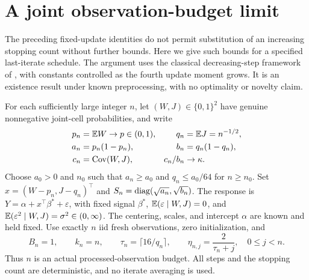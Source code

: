 \section{A joint observation-budget limit}
\label{sec:budget}

The preceding fixed-update identities do not permit substitution of an
increasing stopping count without further bounds. Here we give such bounds for a
specified last-iterate schedule. The argument uses the classical decreasing-step
framework of \citet{moulines2011nonasymptotic}, with constants controlled as the
fourth update moment grows. It is an existence result under known preprocessing,
with no optimality or novelty claim.

For each sufficiently large integer $n$, let $(W,J) \in \{0,1\}^2$ have genuine
nonnegative joint-cell probabilities, and write
\[
 \begin{aligned}
  p_n & = \mathbb{E} W \to p \in (0,1), & q_n     & = \mathbb{E} J = n^{-1/2}, \\
  a_n & = p_n(1 - p_n),         & b_n     & = q_n(1 - q_n),    \\
  c_n & = \operatorname{Cov}(W,J),            & c_n/b_n & \to \kappa.
 \end{aligned}
\]
Choose $a_0 > 0$ and $n_0$ such that $a_n \ge a_0$ and $q_n \le a_0/64$ for
$n \ge n_0$. Set $x = (W - p_n,J - q_n)^\top$ and
$S_n = \operatorname{diag}(\sqrt{a_n},\sqrt{b_n})$. The response is
$Y = \alpha + x^\top\beta^* + \varepsilon$, with fixed signal $\beta^*$,
$\mathbb{E}(\varepsilon \mid W,J) = 0$, and
$\mathbb{E}(\varepsilon^2 \mid W,J) = \sigma^2 \in (0,\infty)$. The centering, scales,
and intercept $\alpha$ are known and held fixed. Use exactly $n$ iid fresh
observations, zero initialization, and
\begin{equation}
 \label{eq:budget-schedule}
 B_n = 1,\qquad k_n
     = n,\qquad \tau_n
     = \lceil16/q_n\rceil,\qquad \eta_{n,j}
     = \frac{2}{\tau_n + j},\quad 0
     \le j
     < n.
\end{equation}
Thus $n$ is an actual processed-observation budget. All steps and the stopping
count are deterministic, and no iterate averaging is used.

